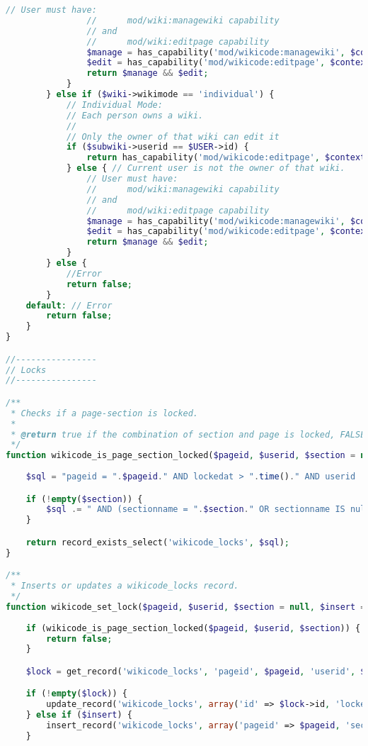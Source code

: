 \begin{lstlisting}[language=PHP]
                // User must have:
                //      mod/wiki:managewiki capability
                // and
                //      mod/wiki:editpage capability
                $manage = has_capability('mod/wikicode:managewiki', $context);
                $edit = has_capability('mod/wikicode:editpage', $context);
                return $manage && $edit;
            }
        } else if ($wiki->wikimode == 'individual') {
            // Individual Mode:
            // Each person owns a wiki.
            //
            // Only the owner of that wiki can edit it
            if ($subwiki->userid == $USER->id) {
                return has_capability('mod/wikicode:editpage', $context);
            } else { // Current user is not the owner of that wiki.
                // User must have:
                //      mod/wiki:managewiki capability
                // and
                //      mod/wiki:editpage capability
                $manage = has_capability('mod/wikicode:managewiki', $context);
                $edit = has_capability('mod/wikicode:editpage', $context);
                return $manage && $edit;
            }
        } else {
            //Error
            return false;
        }
    default: // Error
        return false;
    }
}

//----------------
// Locks
//----------------

/**
 * Checks if a page-section is locked.
 *
 * @return true if the combination of section and page is locked, FALSE otherwise.
 */
function wikicode_is_page_section_locked($pageid, $userid, $section = null) {
    
    $sql = "pageid = ".$pageid." AND lockedat > ".time()." AND userid != ".$userid;

    if (!empty($section)) {
        $sql .= " AND (sectionname = ".$section." OR sectionname IS null)";
    }

    return record_exists_select('wikicode_locks', $sql);
}

/**
 * Inserts or updates a wikicode_locks record.
 */
function wikicode_set_lock($pageid, $userid, $section = null, $insert = false) {
    
    if (wikicode_is_page_section_locked($pageid, $userid, $section)) {
        return false;
    }

    $lock = get_record('wikicode_locks', 'pageid', $pageid, 'userid', $userid, 'sectionname', $section);

    if (!empty($lock)) {
        update_record('wikicode_locks', array('id' => $lock->id, 'lockedat' => time() + LOCK_TIMEOUT));
    } else if ($insert) {
        insert_record('wikicode_locks', array('pageid' => $pageid, 'sectionname' => $section, 'userid' => $userid, 'lockedat' => time() + 30));
    }


\end{lstlisting}

